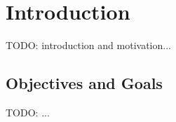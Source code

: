 \chapter{Introduction}

TODO: introduction and motivation...

\section{Objectives and Goals}

TODO: ...
